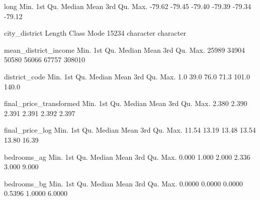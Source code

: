 \documentclass[11pt,]{article}
\begin{document}
long Min. 1st Qu. Median Mean 3rd Qu. Max. -79.62 -79.45 -79.40 -79.39
-79.34 -79.12

city\_district Length Class Mode 15234 character character

mean\_district\_income Min. 1st Qu. Median Mean 3rd Qu. Max. 25989 34904
50580 56066 67757 308010

district\_code Min. 1st Qu. Median Mean 3rd Qu. Max. 1.0 39.0 76.0 71.3
101.0 140.0

final\_price\_transformed Min. 1st Qu. Median Mean 3rd Qu. Max. 2.380
2.390 2.391 2.391 2.392 2.397

final\_price\_log Min. 1st Qu. Median Mean 3rd Qu. Max. 11.54 13.19
13.48 13.54 13.80 16.39

bedrooms\_ag Min. 1st Qu. Median Mean 3rd Qu. Max. 0.000 1.000 2.000
2.336 3.000 9.000

bedrooms\_bg Min. 1st Qu. Median Mean 3rd Qu. Max. 0.0000 0.0000 0.0000
0.5396 1.0000 6.0000

\hypertarget{section}{%
\subsubsection{}\label{section}}
\end{document}
